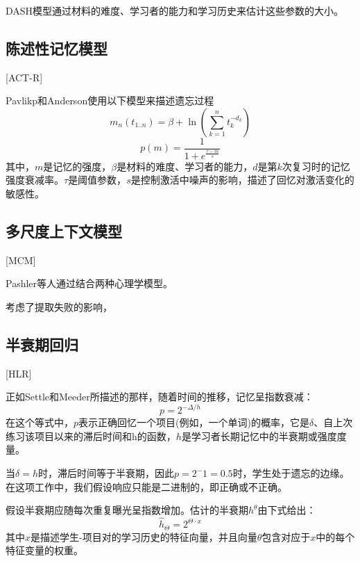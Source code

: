 DASH模型通过材料的难度、学习者的能力和学习历史来估计这些参数的大小\cite{jonesPredictingImprovingMemory2016}。

\subsection{陈述性记忆模型}[ACT-R]

Pavlikp和Anderson\cite{pavlikUsingModelCompute2008}使用以下模型来描述遗忘过程
\begin{equation}
m_n(t_{1..n}) = \beta + \ln(\sum\limits_{k=1}^n t_k^{-d_k})
\end{equation}
\begin{equation}
p(m) = \frac{1}{1+e^{\frac{\tau-m}{s}}}
\end{equation}
其中，$m$是记忆的强度，$\beta$是材料的难度、学习者的能力，$d$是第$k$次复习时的记忆强度衰减率。$\tau$是阈值参数，$s$是控制激活中噪声的影响，描述了回忆对激活变化的敏感性。

\subsection{多尺度上下文模型}[MCM]

Pashler等人\cite{pashlerPredictingOptimalSpacing2009}通过结合两种心理学模型。

考虑了提取失败的影响，

\subsection{半衰期回归}[HLR]

正如Settle和Meeder\cite{settlesTrainableSpacedRepetition2016}所描述的那样，随着时间的推移，记忆呈指数衰减：
\begin{equation}
p = 2^{-\Delta/h}
\end{equation}
在这个等式中，$p$表示正确回忆一个项目(例如，一个单词)的概率，它是$\delta$、自上次练习该项目以来的滞后时间和h的函数，$h$是学习者长期记忆中的半衰期或强度度量。

当$\delta=h$时，滞后时间等于半衰期，因此$p=2^-1=0.5$时，学生处于遗忘的边缘。在这项工作中，我们假设响应只能是二进制的，即正确或不正确。

假设半衰期应随每次重复曝光呈指数增加。估计的半衰期$h^\theta$由下式给出：
\begin{equation}
\hat{h}_{\Theta}=2^{\Theta\cdot x}
\end{equation}
其中$x$是描述学生-项目对的学习历史的特征向量，并且向量$\theta$包含对应于$x$中的每个特征变量的权重。

